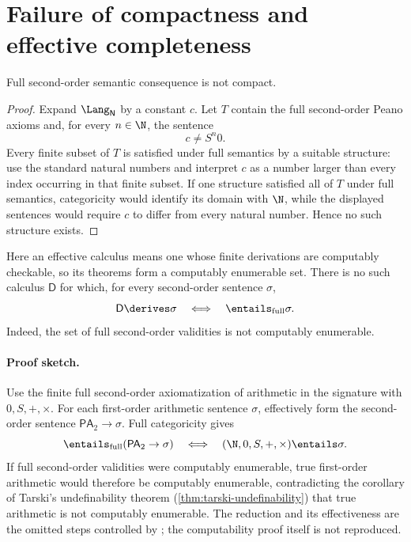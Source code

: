 \section{Failure of compactness and effective completeness}
\label{sec:second-order-logic-04}

\begin{theorem}
Full second-order semantic consequence is not compact.
\end{theorem}

\begin{proof}
Expand \(\Lang_{\mathsf N}\) by a constant \(c\).  Let \(T\) contain the full
second-order Peano axioms and, for every \(n\in\N\), the sentence
\[
  c\ne S^n0.
\]
Every finite subset of \(T\) is satisfied under full semantics by a suitable
structure: use the standard natural numbers and interpret \(c\) as a number
larger than every index occurring in that finite subset.  If one structure
satisfied all of \(T\) under full semantics, categoricity would identify its
domain with \(\N\), while the displayed sentences would require \(c\) to
differ from every natural number.  Hence no such structure exists.
\end{proof}

\begin{theorem}
Here an effective calculus means one whose finite derivations are
computably checkable, so its theorems form a computably enumerable set.  There
is no such calculus \(\mathsf D\) for which, for every second-order sentence
\(\sigma\),
\[
  \mathsf D\derives\sigma
  \quad\Longleftrightarrow\quad
  \entails_{\mathrm{full}}\sigma.
\]
Indeed, the set of full second-order validities is not computably enumerable.
\end{theorem}

\paragraph{Proof sketch.}
Use the finite full second-order axiomatization of arithmetic in the signature
with \(0,S,+,\times\).  For each first-order arithmetic sentence \(\sigma\),
effectively form the second-order sentence
\(\mathsf{PA}_2\to\sigma\).  Full categoricity gives
\[
  \entails_{\mathrm{full}}(\mathsf{PA}_2\to\sigma)
  \quad\Longleftrightarrow\quad
  (\N,0,S,+,\times)\entails\sigma.
\]
If full second-order validities were computably enumerable, true
first-order arithmetic would therefore be computably enumerable,
contradicting the corollary of Tarski's undefinability theorem
(\cref{thm:tarski-undefinability}) that true arithmetic is not computably
enumerable.  The reduction and its effectiveness are the omitted
steps controlled by \cite{BarwiseFeferman1985,Shapiro1991}; the computability
proof itself is not reproduced.

